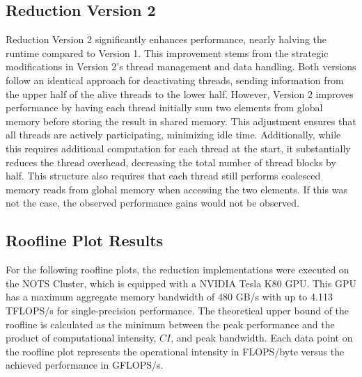 \documentclass{article}
\begin{document}
\subsection{Reduction Version 2}
Reduction Version 2 significantly enhances performance, nearly halving the runtime compared to Version 1. This improvement stems from the strategic modifications in Version 2's thread management and data handling. Both versions follow an identical approach for deactivating threads, sending information from the upper half of the alive threads to the lower half. However, Version 2 improves performance by having each thread initially sum two elements from global memory before storing the result in shared memory. This adjustment ensures that all threads are actively participating, minimizing idle time. Additionally, while this requires additional computation for each thread at the start, it substantially reduces the thread overhead, decreasing the total number of thread blocks by half. This structure also requires that each thread still performs coalesced memory reads from global memory when accessing the two elements. If this was not the case, the observed performance gains would not be observed.

\subsection{Roofline Plot Results}

For the following roofline plots, the reduction implementations were executed on the NOTS Cluster, which is equipped with a NVIDIA Tesla K80 GPU. This GPU has a maximum aggregate memory bandwidth of 480 GB/s with up to 4.113 TFLOPS/s for single-precision performance. The theoretical upper bound of the roofline is calculated as the minimum between the peak performance and the product of computational intensity, \(CI\), and peak bandwidth. Each data point on the roofline plot represents the operational intensity in FLOPS/byte versus the achieved performance in GFLOPS/s.
\end{document}
